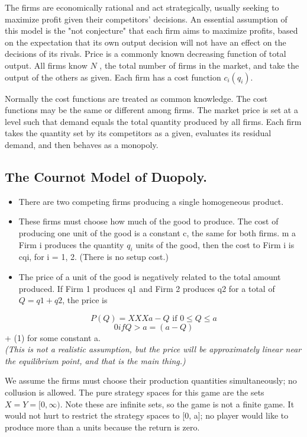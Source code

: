 \documentclass[]{article}
\begin{document}
The firms are economically rational and act strategically, usually seeking to maximize profit given their competitors' decisions.
An essential assumption of this model is the "not conjecture" that each firm aims to maximize profits, based on the expectation that its own output decision will not have an effect on the decisions of its rivals. Price is a commonly known decreasing function of total output. All firms know ${\displaystyle N}$ , the total number of firms in the market, and take the output of the others as given. Each firm has a cost function ${\displaystyle c_{i}(q_{i})}$. 

Normally the cost functions are treated as common knowledge. The cost functions may be the same or different among firms. The market price is set at a level such that demand equals the total quantity produced by all firms. Each firm takes the quantity set by its competitors as a given, evaluates its residual demand, and then behaves as a monopoly.


\subsection{The Cournot Model of Duopoly.} 
\begin{itemize}
    \item There are two competing firms producing a
single homogeneous product. 
\item These firms must choose how much of the good to produce.
The cost of producing one unit of the good is a constant c, the same for both firms. m 
\iteIf
a Firm i produces the quantity $q_i$ units of the good, then the cost to Firm i is cqi, for
i = 1, 2. (There is no setup cost.) 
\item The price of a unit of the good is negatively related to
the total amount produced. If Firm 1 produces q1 and Firm 2 produces q2 for a total of
$Q = q1 + q2$, the price is
\end{itemize}
\[P(Q) = XXX a − Q \mbox{ if } 0 \leq Q \leq a\]
\[0 if Q>a = (a − Q)\]
+ (1)
for some constant a. 
\\
\textit{(This is not a realistic assumption, but the price will be approximately linear near the equilibrium point, and that is the main thing.) }

We assume the firms must
choose their production quantities simultaneously; no collusion is allowed.
The pure strategy spaces for this game are the sets $X = Y = [0,\infty)$. Note these are
infinite sets, so the game is not a finite game. It would not hurt to restrict the strategy
spaces to [0, a]; no player would like to produce more than a units because the return is
zero. 
\end{document}
